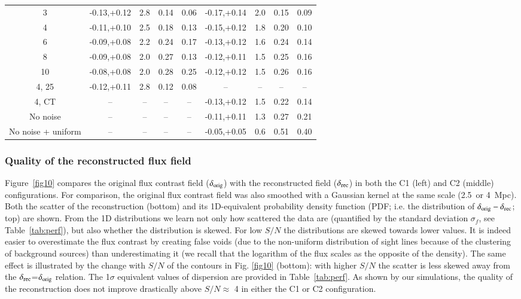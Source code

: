 \documentclass{aa}
\begin{document}
\begin{table*}
\begin{center}
\begin{tabular}{ c c c c c c c c c}
             3  & -0.13,+0.12 & 2.8 & 0.14 & 0.06 & -0.17,+0.14 & 2.0 & 0.15 & 0.09\\
             4  & -0.11,+0.10 & 2.5 & 0.18 & 0.13 & -0.15,+0.12 & 1.8 & 0.20 & 0.10\\
             6  & -0.09,+0.08 & 2.2 & 0.24 & 0.17 & -0.13,+0.12 & 1.6 & 0.24 & 0.14\\
             8  & -0.09,+0.08 & 2.0 & 0.27 & 0.13 & -0.12,+0.11 & 1.5 & 0.25 & 0.16\\
             10 & -0.08,+0.08 & 2.0 & 0.28 & 0.25 & -0.12,+0.12 & 1.5 & 0.26 & 0.16\\
  \hline
          4, 25 & -0.12,+0.11 &  2.8   &0.12 &  0.08 & --          & --& --& --\\
          4, CT &      --     & --  & --   & --   & -0.13,+0.12 & 1.5 & 0.22 & 0.14  \\
          No noise &      --     & --  & --   & --   & -0.11,+0.11 & 1.3 & 0.27 & 0.21  \\
          No noise + uniform & --     & --  & --   & --   & -0.05,+0.05 & 0.6 & 0.51 & 0.40\\
   \hline
\end{tabular}
\end{center}
\end{table*}

\subsubsection{Quality of the reconstructed flux field}
\label{density_comp}
Figure~\ref{fig10} compares the original flux contrast field ($\delta_{\rm orig}$) with the reconstructed field ($\delta_{\rm rec}$) in both the C1 (left) and C2 (middle) configurations. For comparison, the original flux contrast field was also smoothed with a Gaussian kernel at the same scale (2.5~or 4~Mpc). Both the scatter of the reconstruction (bottom) and its 1D-equivalent probability density function (PDF; i.e. the distribution of $\delta_{\rm orig}-\delta_{\rm rec}$; top) are shown. From the 1D distributions we learn not only how scattered the data are (quantified by the standard deviation $\sigma_{f}$, see Table~\ref{tab:perf}), but also whether the distribution is skewed. For low $S/N$ the distributions are skewed towards lower values. It is indeed easier to overestimate the flux  contrast by creating false voids (due to the non-uniform distribution of sight lines because of the clustering of background sources) than underestimating it (we recall that the logarithm of the flux scales as the opposite of the density). The same effect is illustrated by the change with $S/N$ of the contours in Fig. \ref{fig10} (bottom): with higher $S/N$ the scatter is less skewed away from the $\delta_{\rm rec}$=$\delta_{\rm orig}$ relation. The 1$\sigma$ equivalent values of dispersion are provided in Table~\ref{tab:perf}. As shown by our simulations, the quality of the reconstruction does not improve drastically above $S/N\approx$ 4 in either the C1 or C2 configuration. 
\end{document}
